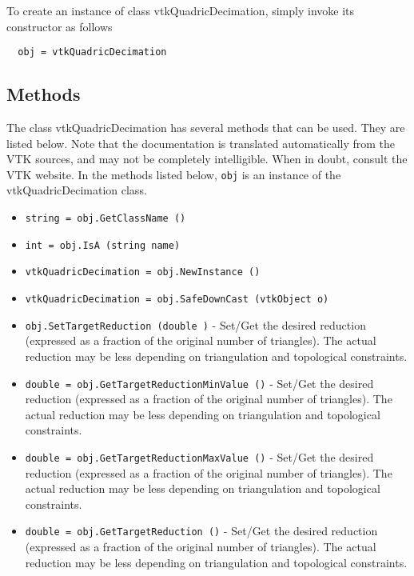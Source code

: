 To create an instance of class vtkQuadricDecimation, simply
invoke its constructor as follows
\begin{verbatim}
  obj = vtkQuadricDecimation
\end{verbatim}
\subsection{Methods}

The class vtkQuadricDecimation has several methods that can be used.
  They are listed below.
Note that the documentation is translated automatically from the VTK sources,
and may not be completely intelligible.  When in doubt, consult the VTK website.
In the methods listed below, \verb|obj| is an instance of the vtkQuadricDecimation class.
\begin{itemize}
\item  \verb|string = obj.GetClassName ()|

\item  \verb|int = obj.IsA (string name)|

\item  \verb|vtkQuadricDecimation = obj.NewInstance ()|

\item  \verb|vtkQuadricDecimation = obj.SafeDownCast (vtkObject o)|

\item  \verb|obj.SetTargetReduction (double )| -  Set/Get the desired reduction (expressed as a fraction of the original
 number of triangles). The actual reduction may be less depending on
 triangulation and topological constraints.

\item  \verb|double = obj.GetTargetReductionMinValue ()| -  Set/Get the desired reduction (expressed as a fraction of the original
 number of triangles). The actual reduction may be less depending on
 triangulation and topological constraints.

\item  \verb|double = obj.GetTargetReductionMaxValue ()| -  Set/Get the desired reduction (expressed as a fraction of the original
 number of triangles). The actual reduction may be less depending on
 triangulation and topological constraints.

\item  \verb|double = obj.GetTargetReduction ()| -  Set/Get the desired reduction (expressed as a fraction of the original
 number of triangles). The actual reduction may be less depending on
 triangulation and topological constraints.


\end{itemize}
